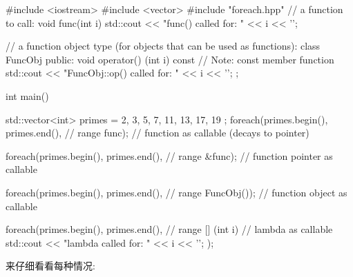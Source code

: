 \begin{cpp}
#include <iostream>
#include <vector>
#include "foreach.hpp"
// a function to call:
void func(int i)
{
	std::cout << "func() called for: " << i << ’\n’;
}

// a function object type (for objects that can be used as functions):
class FuncObj {
	public:
	void operator() (int i) const { // Note: const member function
		std::cout << "FuncObj::op() called for: " << i << ’\n’;
	}
};

int main()
{
	std::vector<int> primes = { 2, 3, 5, 7, 11, 13, 17, 19 };
	foreach(primes.begin(), primes.end(), // range
			func); // function as callable (decays to pointer)

	foreach(primes.begin(), primes.end(), // range
			&func); // function pointer as callable

	foreach(primes.begin(), primes.end(), // range
			FuncObj()); // function object as callable

	foreach(primes.begin(), primes.end(), // range
			[] (int i) { // lambda as callable
				std::cout << "lambda called for: " << i << ’\n’;
			});
}
\end{cpp}

来仔细看看每种情况:

